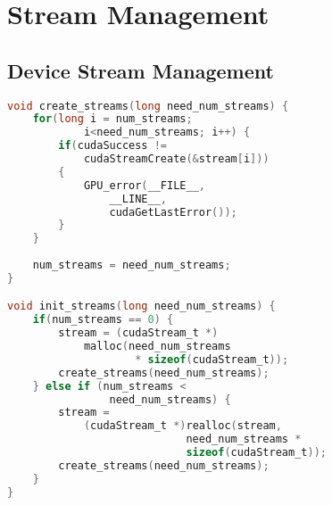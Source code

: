 \chapter{Stream Management} \label{chap:StreamManagement}
\section{Device Stream Management} \label{sec:DeviceStreamManagement}
\begin{lstlisting}[language=C,caption={Device Stream Management}]
void create_streams(long need_num_streams) {
	for(long i = num_streams; 
	        i<need_num_streams; i++) {
		if(cudaSuccess != 
		    cudaStreamCreate(&stream[i])) 
		{ 
		    GPU_error(__FILE__, 
		        __LINE__, 
		        cudaGetLastError());
		}
	}
	
	num_streams = need_num_streams;
}

void init_streams(long need_num_streams) {
	if(num_streams == 0) {
		stream = (cudaStream_t *)
		    malloc(need_num_streams 
		            * sizeof(cudaStream_t));
		create_streams(need_num_streams);
	} else if (num_streams < 
	            need_num_streams) {
		stream = 
		    (cudaStream_t *)realloc(stream, 
		                    need_num_streams * 
		                    sizeof(cudaStream_t));	
		create_streams(need_num_streams);
	}
}
\end{lstlisting}